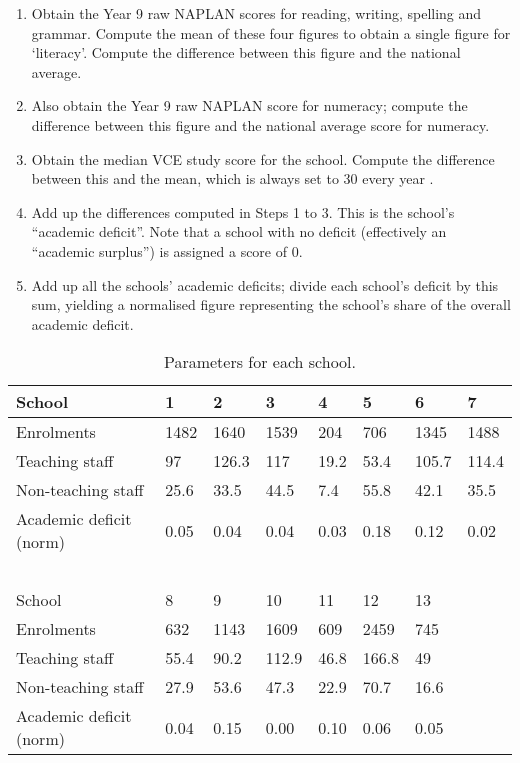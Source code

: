 \documentclass[11pt, a4paper]{article}
\begin{document}
    \begin{enumerate}
        \item Obtain the Year 9 raw NAPLAN scores for reading, writing, spelling and grammar. Compute the mean of these four figures to obtain a single figure for `literacy'. Compute the difference between this figure and the national average. 
        \item Also obtain the Year 9 raw NAPLAN score for numeracy; compute the difference between this figure and the national average score for numeracy.
        \item Obtain the median VCE study score for the school. Compute the difference between this and the mean, which is always set to 30 every year \parencite{vce_info}.
        \item Add up the differences computed in Steps 1 to 3. This is the school's ``academic deficit''. Note that a school with no deficit (effectively an ``academic surplus'') is assigned a score of 0.
        \item Add up all the schools' academic deficits; divide each school's deficit by this sum, yielding a normalised figure representing the school's share of the overall academic deficit.
    \end{enumerate}

    \begin{table}[!ht]
        \centering
        \caption{Parameters for each school.}
        \begin{tabular}{|l|l|l|l|l|l|l|l|}
            \hline
                School & 1 & 2 & 3 & 4 & 5 & 6 & 7 \\ \hline
                Enrolments & 1482 & 1640 & 1539 & 204 & 706 & 1345 & 1488 \\ \hline
                Teaching staff & 97 & 126.3 & 117 & 19.2 & 53.4 & 105.7 & 114.4 \\ \hline
                Non-teaching staff & 25.6 & 33.5 & 44.5 & 7.4 & 55.8 & 42.1 & 35.5 \\ \hline
                Academic deficit (norm) & 0.05 & 0.04 & 0.04 & 0.03 & 0.18 & 0.12 & 0.02 \\ \hline
                ~ & ~ & ~ & ~ & ~ & ~ & ~ & ~ \\ \hline
                School & 8 & 9 & 10 & 11 & 12 & 13 & ~ \\ \hline
                Enrolments & 632 & 1143 & 1609 & 609 & 2459 & 745 & ~ \\ \hline
                Teaching staff & 55.4 & 90.2 & 112.9 & 46.8 & 166.8 & 49 & ~ \\ \hline
                Non-teaching staff & 27.9 & 53.6 & 47.3 & 22.9 & 70.7 & 16.6 & ~ \\ \hline
                Academic deficit (norm) & 0.04 & 0.15 & 0.00 & 0.10 & 0.06 & 0.05 & ~ \\ \hline
        \end{tabular}
        \label{params}
    \end{table}
\end{document}
